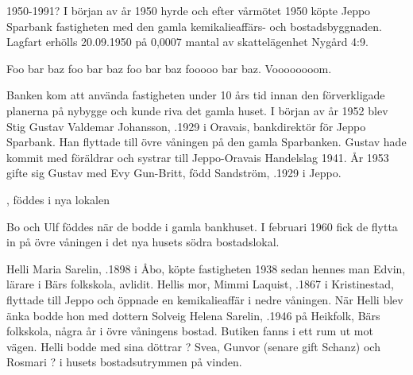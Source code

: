 
1950-1991?
I början av år 1950 hyrde och efter vårmötet 1950 köpte Jeppo Sparbank fastigheten med den gamla kemikalieaffärs- och 	bostadsbyggnaden. Lagfart erhölls 20.09.1950 på 0,0007 mantal	av skattelägenhet Nygård 4:9.


Foo bar baz foo bar baz foo bar baz fooooo bar baz. Voooooooom.



Banken kom att använda fastigheten under 10 års tid innan den förverkligade planerna på nybygge och kunde riva det gamla huset. I början av år 1952 blev Stig Gustav Valdemar Johansson, .1929 i Oravais, bankdirektör för Jeppo Sparbank. Han flyttade till övre våningen på den gamla Sparbanken. Gustav hade kommit med föräldrar och systrar till Jeppo-Oravais Handelslag 1941. År 1953 gifte sig Gustav med Evy Gun-Britt, född Sandström, .1929 i Jeppo.
\begin{jhchildren}
  \item {}
  \item {}
  \item {}, föddes i nya lokalen
\end{jhchildren}
Bo och Ulf föddes när de bodde i gamla bankhuset. I februari 1960 fick de flytta in på övre våningen i det nya husets södra bostadslokal.



Helli Maria Sarelin, .1898 i Åbo, köpte fastigheten 1938 sedan hennes man Edvin, lärare i Bärs folkskola, avlidit. Hellis mor, Mimmi Laquist, .1867 i Kristinestad, flyttade till Jeppo och öppnade en kemikalieaffär i nedre våningen. När Helli blev änka bodde hon med dottern Solveig Helena Sarelin, .1946 på Heikfolk, Bärs folkskola, några år i övre våningens bostad. Butiken fanns i ett rum ut mot vägen.
Helli bodde med sina döttrar  ? Svea, Gunvor (senare gift Schanz) och Rosmari ? i husets bostadsutrymmen på vinden.

